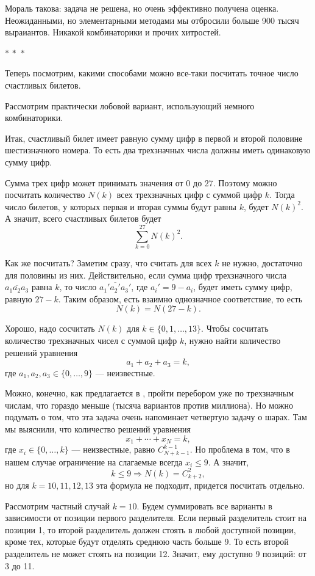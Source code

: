 \documentclass[a4paper,12pt]{article}
\renewcommand{\le}{\leqslant}
\newcommand{\threestars}{\begin{center}$ {\ast}\,{\ast}\,{\ast} $\end{center}}
\newcounter{th-counter}
\begin{document}
Мораль такова: задача не решена, но очень эффективно получена оценка. Неожиданными, но элементарными методами мы отбросили больше 900 тысяч выраиантов. Никакой комбинаторики и прочих хитростей.

\threestars

Теперь посмотрим, какими способами можно все-таки посчитать точное число счастливых билетов.

Рассмотрим практически лобовой вариант, использующий немного комбинаторики.

Итак, счастливый билет имеет равную сумму цифр в первой и второй половине шестизначного номера. То есть два трехзначных числа должны иметь одинаковую сумму цифр.

Сумма трех цифр может принимать значения от 0 до 27. Поэтому можно посчитать количество $N(k)$ всех трехзначных цифр с суммой цифр $k$. Тогда число билетов, у которых первая и вторая суммы будут равны $k$, будет $N(k)^2$. А значит, всего счастливых билетов будет
\[
\sum_{k=0}^{27} N(k)^2.
\]

Как же посчитать? Заметим сразу, что считать для всех $k$ не нужно, достаточно для половины из них. Действительно, если сумма цифр трехзначного числа $\overline{a_1a_2a_3}$ равна $k$, то число $\overline{a_1'a_2'a_3'}$, где $a_i' = 9- a_i$, будет иметь сумму цифр, равную $27-k$. Таким образом, есть взаимно однозначное соответствие, то есть
\[
N(k) = N(27-k).
\]

Хорошо, надо сосчитать $N(k)$ для $k \in \{0, 1, \ldots, 13\}$. Чтобы сосчитать количество трехзначных чисел с суммой цифр $k$, нужно найти количество решений уравнения
\[
a_1 + a_2 + a_3 = k,
\]
где $a_1, a_2, a_3 \in \{0, \ldots, 9\}$ --- неизвестные.

Можно, конечно, как предлагается в \cite{OneMoreTimeAboutHappyTickets}, пройти перебором уже по трехзначным числам, что гораздо меньше (тысяча вариантов против миллиона). Но можно подумать о том, что эта задача очень напоминает четвертую задачу о шарах. Там мы выяснили, что количество решений уравнения
\[
x_1 + \cdots + x_N = k,
\]
где $x_i \in \{0, \ldots, k\}$ --- неизвестные, равно $C_{N+k-1}^{k-1}$. Но проблема в том, что в нашем случае ограничение на слагаемые всегда $x_i \le 9$. А значит, 
\[
k \le 9 \Rightarrow N(k) = C_{k+2}^2,
\]
но для $k = 10, 11, 12, 13$ эта формула не подходит, придется посчитать отдельно.

Рассмотрим частный случай $k = 10$. Будем суммировать все варианты в зависимости от позиции первого разделителя. Если первый разделитель стоит на позиции 1, то второй разделитель должен стоять в любой доступной позиции, кроме тех, которые будут отделять среднюю часть больше 9. То есть второй разделитель не может стоять на позиции 12. Значит, ему доступно 9 позиций: от 3 до 11.
\end{document}
